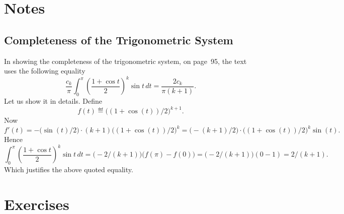 

\section{Notes}

\subsection{Completeness of the Trigonometric System}
\label{sec:comp:trig}

In showing the completeness of the trigonometric system,
on page~95, the text uses the following equality
\begin{equation*}
\frac{c_k}{\pi}\int_0^\pi \left(\frac{1 + \cos t}{2}\right)^k \sin t\,dt =
  \frac{2c_k}{\pi(k+1)}.
\end{equation*}
Let us show it in details. Define
\begin{equation*}
f(t) \eqdef \bigl((1+\cos(t))/2\bigr)^{k+1}.
\end{equation*}
Now
\begin{equation*}
f'(t)
= -\bigl(\sin(t)/2\bigr)\cdot(k+1)\bigl((1+\cos(t))/2\bigr)^k
= \bigl(-(k+1)/2\bigr)\cdot\bigl((1+\cos(t))/2\bigr)^k\sin(t).
\end{equation*}
Hence
\begin{equation*}
\int_0^\pi \left(\frac{1 + \cos t}{2}\right)^k \sin t\,dt
 = \bigl(-2/(k+1)\bigr) \bigl(f(\pi) - f(0)\bigr)
 = \bigl(-2/(k+1)\bigr) (0 - 1)
 = 2/(k+1).
\end{equation*}
Which justifies the above quoted equality.


\section{Exercises} %

